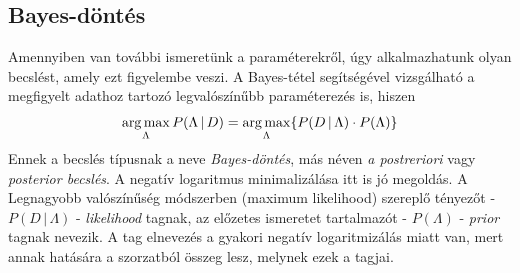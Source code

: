 \subsection{Bayes-döntés}
Amennyiben van további ismeretünk a paraméterekről, úgy alkalmazhatunk olyan becslést, amely ezt figyelembe veszi. A Bayes-tétel segítségével vizsgálható a megfigyelt adathoz tartozó legvalószínűbb paraméterezés is, hiszen
$$\operatorname*{arg\,max}_{\Lambda}{P(\Lambda\,|\,D)} = \operatorname*{arg\,max}_{\Lambda}\{P(D\,|\,\Lambda) \cdot P(\Lambda)\}$$
Ennek a becslés típusnak a neve \emph{Bayes-döntés}, más néven \emph{a postreriori} vagy \emph{posterior becslés}. A negatív logaritmus minimalizálása itt is jó megoldás. A Legnagyobb valószínűség módszerben (maximum likelihood) szereplő tényezőt - $P(D\,|\,\Lambda)$ - \emph{likelihood} tagnak, az előzetes ismeretet tartalmazót - $P(\Lambda)$ - \emph{prior} tagnak nevezik. A tag elnevezés a gyakori negatív logaritmizálás miatt van, mert annak hatására a szorzatból összeg lesz, melynek ezek a tagjai.
